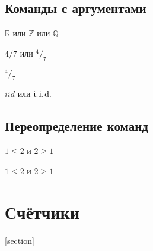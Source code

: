 \documentclass[12pt, a4paper]{article}
\theoremstyle{plain}              %
\theoremstyle{definition}         %
\begin{document}


\subsection{Команды с аргументами}

\newcommand{\bb}[1]{\ensuremath{\mathbb{#1}} }

\bb{R} или \bb{Z} или \bb{Q}


$4/7$ или $^4/_7$

\newcommand{\fr}[2]{^#1/_#2}

$\fr{4}{7}$


\newcommand{\iid}{\text{i.\hspace{1pt}i.\hspace{1pt}d.}}

$iid$ или $\iid$

\subsection{Переопределение команд}

$ 1 \le 2 $ и $ 2 \ge 1 $

\renewcommand{\le}{\leqslant}
\renewcommand{\ge}{\geqslant}

$ 1 \le 2 $ и $ 2 \ge 1 $

\section{Счётчики}


[section]

\setcounter{jtem}{13}



\renewcommand{\thepage}{\Roman{page}}
\renewcommand{\thesection}{\Asbuk{section}}
\setcounter{section}{0}

\end{document}
